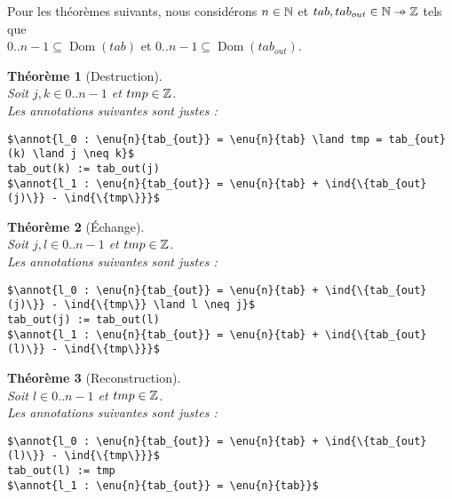 \documentclass[a4paper, 11pt]{article}
\newcommand{\pto}{\mathrel{\ooalign{\hfil$\mapstochar$\hfil\cr$\to$\cr}}}
\DeclareMathOperator{\eenu}{Enum}
\DeclareMathOperator{\ddom}{Dom}
\newcommand{\dom}[1]{\ddom\left(#1\right)}
\newcommand{\enu}[2]{\eenu_{\substack{#1}}\left(#2\right)}
\newcommand{\ind}[1]{\chi_{#1}}
\theoremstyle{mystyle}
\newtheorem{theorem}{Théorème}[section]
\newcommand{\annot}[1]{{\color{black} #1}}
\begin{document}
Pour les théorèmes suivants, nous considérons $n \in \mathbb{N}$ et $tab, tab_{out} \in \N \pto \Z$ tels que\\$0..n - 1 \subseteq \dom{tab}$ et $0..n - 1 \subseteq \dom{tab_{out}}$.

\begin{theorem}[Destruction]\mbox{}\\
Soit $j, k \in 0..n - 1$ et $tmp \in \mathbb{Z}$.\\
Les annotations suivantes sont justes :
\begin{lstlisting}[language=prooflang, mathescape,
    basicstyle=\ttfamily\large\color{blue!90!black},
    keywordstyle=\bfseries,
    tabsize=4]
$\annot{l_0 : \enu{n}{tab_{out}} = \enu{n}{tab} \land tmp = tab_{out}(k) \land j \neq k}$
tab_out(k) := tab_out(j)
$\annot{l_1 : \enu{n}{tab_{out}} = \enu{n}{tab} + \ind{\{tab_{out}(j)\}} - \ind{\{tmp\}}}$
\end{lstlisting}
\end{theorem}



\begin{theorem}[\'Echange]\mbox{}\\
Soit $j, l \in 0..n - 1$ et $tmp \in \mathbb{Z}$.\\
Les annotations suivantes sont justes :
\begin{lstlisting}[language=prooflang, mathescape,
    basicstyle=\ttfamily\large\color{blue!90!black},
    keywordstyle=\bfseries,
    tabsize=4]
$\annot{l_0 : \enu{n}{tab_{out}} = \enu{n}{tab} + \ind{\{tab_{out}(j)\}} - \ind{\{tmp\}} \land l \neq j}$
tab_out(j) := tab_out(l)
$\annot{l_1 : \enu{n}{tab_{out}} = \enu{n}{tab} + \ind{\{tab_{out}(l)\}} - \ind{\{tmp\}}}$
\end{lstlisting}
\end{theorem}

\begin{theorem}[Reconstruction]\mbox{}\\
Soit $l \in 0..n - 1$ et $tmp \in \mathbb{Z}$.\\
Les annotations suivantes sont justes :
\begin{lstlisting}[language=prooflang, mathescape,
    basicstyle=\ttfamily\large\color{blue!90!black},
    keywordstyle=\bfseries,
    tabsize=4]
$\annot{l_0 : \enu{n}{tab_{out}} = \enu{n}{tab} + \ind{\{tab_{out}(l)\}} - \ind{\{tmp\}}}$
tab_out(l) := tmp
$\annot{l_1 : \enu{n}{tab_{out}} = \enu{n}{tab}}$
\end{lstlisting}
\end{theorem}
\end{document}
